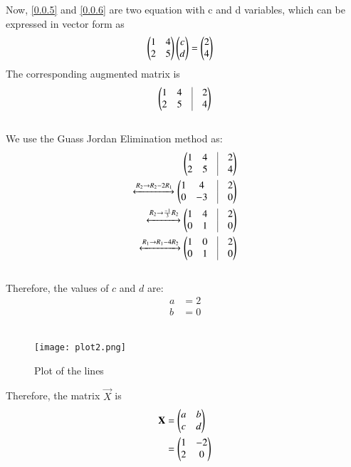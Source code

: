 \documentclass[journal,12pt,twocolumn]{IEEEtran}
\begin{document}
Now, \eqref{0.0.5} and \eqref{0.0.6} are two equation with c and d variables, which can be expressed in vector form as 
\begin{align}
  \begin{pmatrix}1 & 4 \\ 2 & 5\end{pmatrix}\begin{pmatrix}c \\ d\end{pmatrix} &= \begin{pmatrix}2 \\ 4\end{pmatrix} 
\end{align}
The corresponding augmented matrix is
\begin{align}
    	\myvec{
		1 & 4 & \vrule & 2 \\
		2 & 5 & \vrule & 4 \\
	}
\end{align}\\
We use the Guass Jordan Elimination method as:
\begin{align}
	\myvec{
		1 & 4 & \vrule & 2 \\
		2 & 5 & \vrule & 4 \\
	}
	\\
	\xleftrightarrow[]{R_2 \rightarrow R_2 - 2R_1}
	\myvec{
		1 & 4 & \vrule & 2 \\
		0 & -3 & \vrule & 0 \\
	}
	\\
	\xleftrightarrow[]{R_2\rightarrow \frac{-1}{3}R_2}
	\myvec{
		1 & 4 & \vrule & 2 \\
		0 & 1 & \vrule & 0 \\
	}
	\\
	\xleftrightarrow[]{R_1 \rightarrow R_1 - 4R_2}
	\myvec{
		1 & 0 & \vrule & 2 \\
		0 & 1 & \vrule & 0 \\
	}
\end{align}\\
Therefore, the values of $c$ and $d$ are:
\begin{align}
	a &= 2 \\
	b & = 0
\end{align}\\
\begin{figure}[!h]
\centering
\texttt{[image: plot2.png]}
\caption{Plot of the lines}
\label{plt_2}
\end{figure}

Therefore, the matrix $\vec{X}$ is
\begin{align}
  \mathbf{X} &= \begin{pmatrix}a & b \\ c & d\end{pmatrix}\\
          &= \begin{pmatrix}1 & -2 \\ 2 & 0\end{pmatrix}
\end{align}
\end{document}
